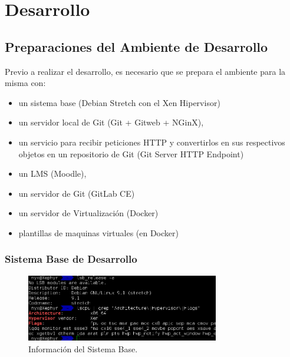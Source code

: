 
\chapter{Desarrollo}
\label{capitulo4}

        
\section{Preparaciones del Ambiente de Desarrollo}
Previo a realizar el desarrollo, es necesario que se prepara el ambiente para la misma con:
\begin{itemize}
  \item un sistema base (Debian Stretch con el Xen Hipervisor)
  \item un servidor local de Git (Git + Gitweb + NGinX),
  \item un servicio para recibir peticiones HTTP y convertirlos en sus respectivos objetos en un repositorio de Git (Git Server HTTP Endpoint)
  \item un LMS  (Moodle),
  \item un servidor de Git (GitLab CE)
  \item un servidor de Virtualización (Docker)
  \item plantillas de maquinas virtuales (en Docker)
\end{itemize}

\subsection{Sistema Base de Desarrollo}

\begin{figure}
	\begin{center}
    	\includegraphics[width=0.75\textwidth]{Figures/sistema-base.png}
    \end{center}
  	\caption{Información del Sistema Base.}
    \label{sistema-base}
\end{figure}

